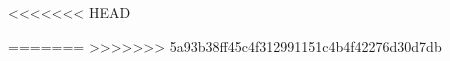 \documentclass{beamer}
\begin{document}





<<<<<<< HEAD

=======
>>>>>>> 5a93b38ff45c4f312991151c4b4f42276d30d7db
	

















	
\end{document}

